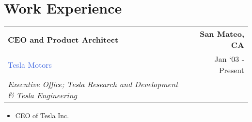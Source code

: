 \documentclass[10pt]{article}
\newcommand{\highlightcolor}{RoyalBlue}
\newcommand{\tabularxwidth}{\textwidth}
\begin{document}
        

    


    
        \section{Work Experience}

    
    \begin{minipage}{\tabularxwidth}

        \begin{tabularx}{\tabularxwidth}{X r}
            \textbf{CEO and Product Architect} & \textbf{San Mateo, 
        CA} \\
            
    
    
    
    

    
        \textcolor{\highlightcolor}{Tesla Motors} & 
        
    Jan ‘03 - Present \\
        
            \textit{Executive Office;}
                \textit{Tesla Research and Development} \textit{\&}
                \textit{Tesla Engineering} & \\
        
    
            
        \end{tabularx}

        \begin{itemize}[noitemsep, topsep=3pt, parsep=0pt, partopsep=0pt]
            
                \item 
    CEO of Tesla Inc.
            
        \end{itemize}

        
            \vspace{.5em}
        

    \end{minipage}
    
\end{document}
